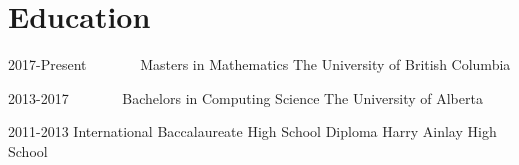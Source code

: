 \documentclass{friggeri-cv} %
\begin{document}

\section{Education}

\begin{entrylist}


\entry
{2017-Present\ \ \ \ \ \ \ }
{Masters {\normalfont in Mathematics}}
{The University of British Columbia}


\entry
{2013-2017\ \ \ \ \ \ \ }
{Bachelors {\normalfont in Computing Science}}
{The University of Alberta}


\entry
{2011-2013}
{International Baccalaureate {\normalfont High School Diploma}}
{Harry Ainlay High School}


\end{entrylist}





\end{document}
